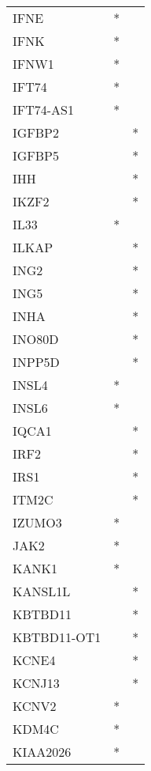 \begin{longtable}{lcc}
IFNE           &         * &         \\
IFNK           &         * &         \\
IFNW1          &         * &         \\
IFT74          &         * &         \\
IFT74-AS1      &         * &         \\
IGFBP2         &           &       * \\
IGFBP5         &           &       * \\
IHH            &           &       * \\
IKZF2          &           &       * \\
IL33           &         * &         \\
ILKAP          &           &       * \\
ING2           &           &       * \\
ING5           &           &       * \\
INHA           &           &       * \\
INO80D         &           &       * \\
INPP5D         &           &       * \\
INSL4          &         * &         \\
INSL6          &         * &         \\
IQCA1          &           &       * \\
IRF2           &           &       * \\
IRS1           &           &       * \\
ITM2C          &           &       * \\
IZUMO3         &         * &         \\
JAK2           &         * &         \\
KANK1          &         * &         \\
KANSL1L        &           &       * \\
KBTBD11        &           &       * \\
KBTBD11-OT1    &           &       * \\
KCNE4          &           &       * \\
KCNJ13         &           &       * \\
KCNV2          &         * &         \\
KDM4C          &         * &         \\
KIAA2026       &         * &         \\

\end{longtable}
